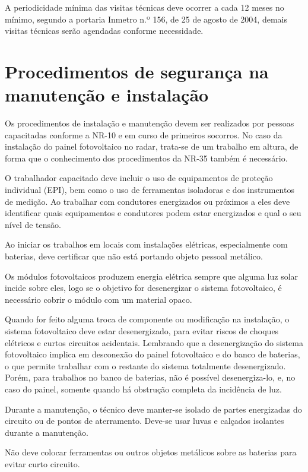 A periodicidade mínima das visitas técnicas deve ocorrer a cada 12 meses no mínimo, segundo a portaria Inmetro n.º 156, de 25 de agosto de 2004, demais visitas técnicas serão agendadas conforme necessidade.

\section{Procedimentos de segurança na manutenção e instalação }

Os procedimentos de instalação e manutenção devem ser realizados por pessoas capacitadas conforme a NR-10 e em curso de primeiros socorros. No caso da instalação do painel fotovoltaico no radar, trata-se de um trabalho em altura, de forma que o conhecimento dos procedimentos da NR-35 também é necessário.

O trabalhador capacitado deve incluir o uso de equipamentos de proteção individual (EPI), bem como o uso de ferramentas isoladoras e dos instrumentos de medição. Ao trabalhar com condutores energizados ou próximos a eles deve identificar quais equipamentos e condutores podem estar energizados e qual o seu nível de tensão.

Ao iniciar os trabalhos em locais com instalações elétricas, especialmente com baterias, deve certificar que não está portando objeto pessoal metálico.

Os módulos fotovoltaicos produzem energia elétrica sempre que alguma luz solar incide sobre eles, logo se o objetivo for desenergizar o sistema fotovoltaico, é necessário cobrir o módulo com um material opaco.

Quando for feito alguma troca de componente ou modificação na instalação, o sistema fotovoltaico deve estar desenergizado, para evitar riscos de choques elétricos e curtos circuitos acidentais. Lembrando que a desenergização do sistema fotovoltaico implica em desconexão do painel fotovoltaico e do banco de baterias, o que permite trabalhar com o restante do sistema totalmente desenergizado. Porém, para trabalhos no banco de baterias, não é possível desenergiza-lo, e, no caso do painel, somente quando há obstrução completa da incidência de luz.

Durante a manutenção, o técnico deve manter-se isolado de partes energizadas do circuito ou de pontos de aterramento. Deve-se usar luvas e calçados isolantes durante a manutenção.

Não deve colocar ferramentas ou outros objetos metálicos sobre as baterias para evitar curto circuito.

